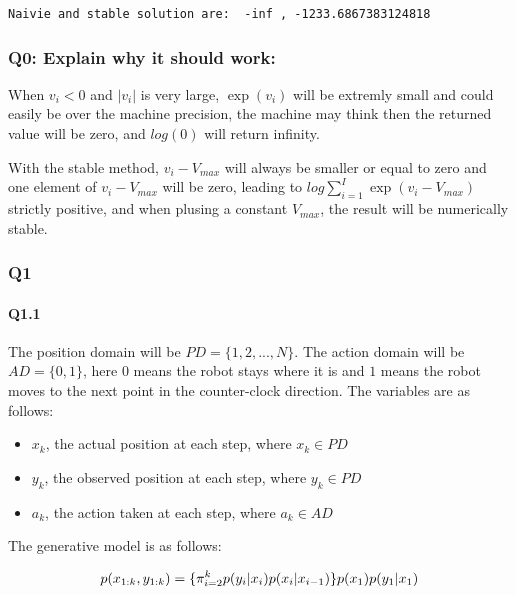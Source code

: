 \documentclass[11pt]{article}
\providecommand{\tightlist}{%
      \setlength{\itemsep}{0pt}\setlength{\parskip}{0pt}}
\begin{document}
    \begin{Verbatim}[commandchars=\\\{\}]
Naivie and stable solution are:  -inf , -1233.6867383124818

    \end{Verbatim}

    \subsubsection{Q0: Explain why it should
work:}\label{q0-explain-why-it-should-work}

When \(v_i < 0\) and \(|v_i|\) is very large, \(\exp(v_i)\) will be
extremly small and could easily be over the machine precision, the
machine may think then the returned value will be zero, and \(log(0)\)
will return infinity.

With the stable method, \(v_i- V_{max}\) will always be smaller or equal
to zero and one element of \(v_i- V_{max}\) will be zero, leading to
\(log\sum_{i=1}^I \exp(v_i- V_{max})\) strictly positive, and when
plusing a constant \(V_{max}\), the result will be numerically stable.

    \subsubsection{Q1}\label{q1}

    \paragraph{Q1.1}\label{q1.1}

The position domain will be \(PD = \{1, 2, ..., N\}\). The action domain
will be \(AD = \{0, 1\}\), here \(0\) means the robot stays where it is
and \(1\) means the robot moves to the next point in the counter-clock
direction. The variables are as follows:

\begin{itemize}
\tightlist
\item
  \(x_k\), the actual position at each step, where \(x_k \in PD\)
\item
  \(y_k\), the observed position at each step, where \(y_k \in PD\)
\item
  \(a_k\), the action taken at each step, where \(a_k \in AD\)
\end{itemize}

The generative model is as follows:

\[\large p(x_{1:k} , y_{1:k}) = \{\pi_{i=2}^{k}p(y_i|x_i)p(x_i|x_{i-1})\}p(x_1)p(y_1|x_1)\]
\end{document}
